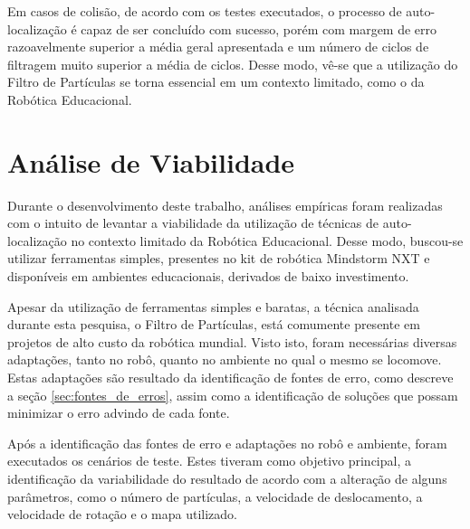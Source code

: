 Em casos de colisão, de acordo com os testes executados, o processo de auto-localização é capaz de ser concluído com sucesso, porém
com margem de erro razoavelmente superior a média geral apresentada e um número de ciclos de filtragem muito superior a média de ciclos. Desse modo,
vê-se que a utilização do Filtro de Partículas se torna essencial em um contexto limitado, como o da Robótica Educacional.

\section{Análise de Viabilidade}
\label{sec:viabilidade}

Durante o desenvolvimento deste trabalho, análises empíricas foram realizadas com o intuito de levantar a viabilidade da utilização
de técnicas de auto-localização no contexto limitado da Robótica Educacional. Desse modo, buscou-se utilizar ferramentas simples,
presentes no kit de robótica Mindstorm NXT e disponíveis em ambientes educacionais, derivados de baixo investimento.

Apesar da utilização de ferramentas simples e baratas, a técnica analisada durante esta pesquisa, o Filtro de Partículas, está comumente
presente em projetos de alto custo da robótica mundial. Visto isto, foram necessárias diversas adaptações, tanto no robô, quanto no ambiente
no qual o mesmo se locomove. Estas adaptações são resultado da identificação de fontes de erro, como descreve a seção \ref{sec:fontes_de_erros},
assim como a identificação de soluções que possam minimizar o erro advindo de cada fonte.

Após a identificação das fontes de erro e adaptações no robô e ambiente, foram executados os cenários de teste. Estes tiveram como objetivo
principal, a identificação da variabilidade do resultado de acordo com a alteração de alguns parâmetros, como o número de partículas,
a velocidade de deslocamento, a velocidade de rotação e o mapa utilizado.
